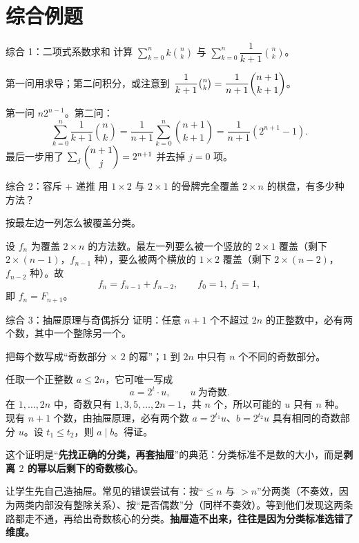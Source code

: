 \section{综合例题}
\begin{problem}{综合 1：二项式系数求和}
计算 $\sum_{k=0}^{n}k\binom nk$ 与 $\sum_{k=0}^{n}\dfrac1{k+1}\binom nk$。
\end{problem}
\hint 第一问用求导；第二问积分，或注意到 $\dfrac1{k+1}\binom nk=\dfrac1{n+1}\dbinom{n+1}{k+1}$。

\sol 第一问 $n2^{n-1}$。第二问：
\[
\sum_{k=0}^{n}\frac1{k+1}\binom nk
=\frac1{n+1}\sum_{k=0}^{n}\binom{n+1}{k+1}
=\frac1{n+1}\left(2^{n+1}-1\right).
\]
最后一步用了 $\sum_{j}\dbinom{n+1}{j}=2^{n+1}$ 并去掉 $j=0$ 项。

\begin{problem}{综合 2：容斥 + 递推}
用 $1\times2$ 与 $2\times1$ 的骨牌完全覆盖 $2\times n$ 的棋盘，有多少种方法？
\end{problem}
\hint 按最左边一列怎么被覆盖分类。

\sol 设 $f_n$ 为覆盖 $2\times n$ 的方法数。最左一列要么被一个竖放的 $2\times1$ 覆盖（剩下 $2\times(n-1)$，$f_{n-1}$ 种），要么被两个横放的 $1\times2$ 覆盖（剩下 $2\times(n-2)$，$f_{n-2}$ 种）。故
\[
f_n=f_{n-1}+f_{n-2},\qquad f_0=1,\ f_1=1,
\]
即 $f_n=F_{n+1}$。

\begin{problem}{综合 3：抽屉原理与奇偶拆分}
证明：任意 $n+1$ 个不超过 $2n$ 的正整数中，必有两个数，其中一个整除另一个。
\end{problem}
\hint 把每个数写成“奇数部分 $\times$ $2$ 的幂”；$1$ 到 $2n$ 中只有 $n$ 个不同的奇数部分。

\sol 任取一个正整数 $a\le2n$，它可唯一写成
\[
a=2^{t}\cdot u,\qquad u\ \text{为奇数}.
\]
在 $1,\ldots,2n$ 中，奇数只有 $1,3,5,\ldots,2n-1$，共 $n$ 个，所以可能的 $u$ 只有 $n$ 种。现有 $n+1$ 个数，由抽屉原理，必有两个数 $a=2^{t_1}u$、$b=2^{t_2}u$ 具有相同的奇数部分 $u$。设 $t_1\le t_2$，则 $a\mid b$。得证。

这个证明是“\textbf{先找正确的分类，再套抽屉}”的典范：分类标准不是数的大小，而是\textbf{剥离 $2$ 的幂以后剩下的奇数核心}。

\begin{teach}[综合 3 讲评要点]
让学生先自己造抽屉。常见的错误尝试有：按“$\le n$ 与 $>n$”分两类（不奏效，因为两类内部没有整除关系）、按“是否偶数”分（同样不奏效）。等到他们发现这两条路都走不通，再给出奇数核心的分类。\textbf{抽屉造不出来，往往是因为分类标准选错了维度。}
\end{teach}

